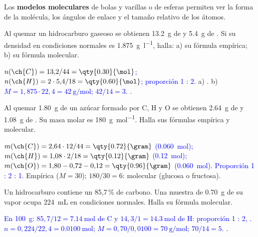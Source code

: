 Los \textbf{modelos moleculares} de bolas y varillas o de esferas permiten ver la forma de la molécula, los ángulos de enlace y el
tamaño relativo de los átomos.

\begin{exercise}
    Al quemar un hidrocarburo gaseoso se obtienen \qty{13.2}{\gram} de  y \qty{5.4}{\gram} de . Si su densidad en
    condiciones normales es \qty{1.875}{\gram\per\litre}, halla: a) su fórmula empírica; b) su fórmula molecular.
    \begin{solu}
        \textcolor{blue}{\(n(\ch{C}) = 13{,}2/44 = \qty{0.30}{\mol}\); \(n(\ch{H}) = 2 \cdot 5{,}4/18 = \qty{0.60}{\mol}\); proporción
        1 : 2.} a) \textcolor{red}{}. b) \textcolor{blue}{\(M = 1{,}875 \cdot 22{,}4 = \qty{42}{\gram\per\mol}\); \(42/14 = 3\).}
        \textcolor{red}{}.
    \end{solu}
\end{exercise}

\begin{exercise}
    Al quemar \qty{1.80}{\gram} de un azúcar formado por C, H y O se obtienen \qty{2.64}{\gram} de  y \qty{1.08}{\gram} de
    . Su masa molar es \qty{180}{\gram\per\mol}. Halla sus fórmulas empírica y molecular.
    \begin{solu}
        \textcolor{blue}{\(m(\ch{C}) = 2{,}64 \cdot 12/44 = \qty{0.72}{\gram}\) (\qty{0.060}{\mol}); \(m(\ch{H}) = 1{,}08 \cdot 2/18 =
        \qty{0.12}{\gram}\) (\qty{0.12}{\mol}); \(m(\ch{O}) = 1{,}80 - 0{,}72 - 0{,}12 = \qty{0.96}{\gram}\) (\qty{0.060}{\mol}).
        Proporción 1 : 2 : 1.} Empírica \textcolor{red}{} (\(M = 30\)); \(180/30 = 6\): molecular
        \textcolor{red}{} (glucosa o fructosa).
    \end{solu}
\end{exercise}

\begin{exercise}
    Un hidrocarburo contiene un 85,7\,\% de carbono. Una muestra de \qty{0.70}{\gram} de su vapor ocupa \qty{224}{\mL} en
    condiciones normales. Halla su fórmula molecular.
    \begin{solu}
        \textcolor{blue}{En \qty{100}{\gram}: \(85{,}7/12 = \qty{7.14}{\mol}\) de C y \(14{,}3/1 = \qty{14.3}{\mol}\) de H: proporción
        1 : 2, . \(n = 0{,}224/22{,}4 = \qty{0.0100}{\mol}\); \(M = 0{,}70/0{,}0100 = \qty{70}{\gram\per\mol}\); \(70/14 = 5\).}
        \textcolor{red}{}.
    \end{solu}
\end{exercise}

